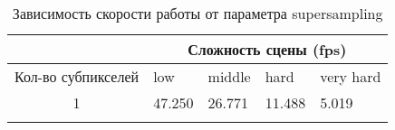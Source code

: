 \begin{center}
\begin{longtable}{|c|p{2cm}|p{2cm}|p{2cm}|p{2cm}|}
\hline & \multicolumn{4}{c|}{Сложность сцены (fps)} \\ 
\hline Кол-во субпикселей & low & middle & hard &  very hard\\ 
\hline 1 &  47.250 & 26.771 & 11.488 & 5.019 \\ 
\hline
\caption{Зависимость скорости работы от параметра supersampling}\label{tab:performance_aa}\end{longtable}
\end{center}

